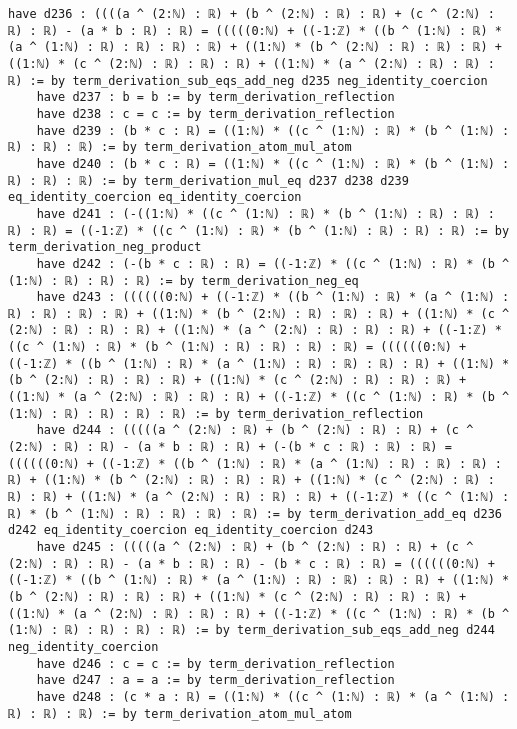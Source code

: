 \documentclass{article}
\begin{document}
\begin{tcolorbox}[colback=white!10, width=\linewidth]
\begin{lstlisting}[language=Lean4]
    have d236 : ((((a ^ (2:ℕ) : ℝ) + (b ^ (2:ℕ) : ℝ) : ℝ) + (c ^ (2:ℕ) : ℝ) : ℝ) - (a * b : ℝ) : ℝ) = (((((0:ℕ) + ((-1:ℤ) * ((b ^ (1:ℕ) : ℝ) * (a ^ (1:ℕ) : ℝ) : ℝ) : ℝ) : ℝ) + ((1:ℕ) * (b ^ (2:ℕ) : ℝ) : ℝ) : ℝ) + ((1:ℕ) * (c ^ (2:ℕ) : ℝ) : ℝ) : ℝ) + ((1:ℕ) * (a ^ (2:ℕ) : ℝ) : ℝ) : ℝ) := by term_derivation_sub_eqs_add_neg d235 neg_identity_coercion
    have d237 : b = b := by term_derivation_reflection
    have d238 : c = c := by term_derivation_reflection
    have d239 : (b * c : ℝ) = ((1:ℕ) * ((c ^ (1:ℕ) : ℝ) * (b ^ (1:ℕ) : ℝ) : ℝ) : ℝ) := by term_derivation_atom_mul_atom
    have d240 : (b * c : ℝ) = ((1:ℕ) * ((c ^ (1:ℕ) : ℝ) * (b ^ (1:ℕ) : ℝ) : ℝ) : ℝ) := by term_derivation_mul_eq d237 d238 d239 eq_identity_coercion eq_identity_coercion
    have d241 : (-((1:ℕ) * ((c ^ (1:ℕ) : ℝ) * (b ^ (1:ℕ) : ℝ) : ℝ) : ℝ) : ℝ) = ((-1:ℤ) * ((c ^ (1:ℕ) : ℝ) * (b ^ (1:ℕ) : ℝ) : ℝ) : ℝ) := by term_derivation_neg_product
    have d242 : (-(b * c : ℝ) : ℝ) = ((-1:ℤ) * ((c ^ (1:ℕ) : ℝ) * (b ^ (1:ℕ) : ℝ) : ℝ) : ℝ) := by term_derivation_neg_eq
    have d243 : ((((((0:ℕ) + ((-1:ℤ) * ((b ^ (1:ℕ) : ℝ) * (a ^ (1:ℕ) : ℝ) : ℝ) : ℝ) : ℝ) + ((1:ℕ) * (b ^ (2:ℕ) : ℝ) : ℝ) : ℝ) + ((1:ℕ) * (c ^ (2:ℕ) : ℝ) : ℝ) : ℝ) + ((1:ℕ) * (a ^ (2:ℕ) : ℝ) : ℝ) : ℝ) + ((-1:ℤ) * ((c ^ (1:ℕ) : ℝ) * (b ^ (1:ℕ) : ℝ) : ℝ) : ℝ) : ℝ) = ((((((0:ℕ) + ((-1:ℤ) * ((b ^ (1:ℕ) : ℝ) * (a ^ (1:ℕ) : ℝ) : ℝ) : ℝ) : ℝ) + ((1:ℕ) * (b ^ (2:ℕ) : ℝ) : ℝ) : ℝ) + ((1:ℕ) * (c ^ (2:ℕ) : ℝ) : ℝ) : ℝ) + ((1:ℕ) * (a ^ (2:ℕ) : ℝ) : ℝ) : ℝ) + ((-1:ℤ) * ((c ^ (1:ℕ) : ℝ) * (b ^ (1:ℕ) : ℝ) : ℝ) : ℝ) : ℝ) := by term_derivation_reflection
    have d244 : (((((a ^ (2:ℕ) : ℝ) + (b ^ (2:ℕ) : ℝ) : ℝ) + (c ^ (2:ℕ) : ℝ) : ℝ) - (a * b : ℝ) : ℝ) + (-(b * c : ℝ) : ℝ) : ℝ) = ((((((0:ℕ) + ((-1:ℤ) * ((b ^ (1:ℕ) : ℝ) * (a ^ (1:ℕ) : ℝ) : ℝ) : ℝ) : ℝ) + ((1:ℕ) * (b ^ (2:ℕ) : ℝ) : ℝ) : ℝ) + ((1:ℕ) * (c ^ (2:ℕ) : ℝ) : ℝ) : ℝ) + ((1:ℕ) * (a ^ (2:ℕ) : ℝ) : ℝ) : ℝ) + ((-1:ℤ) * ((c ^ (1:ℕ) : ℝ) * (b ^ (1:ℕ) : ℝ) : ℝ) : ℝ) : ℝ) := by term_derivation_add_eq d236 d242 eq_identity_coercion eq_identity_coercion d243
    have d245 : (((((a ^ (2:ℕ) : ℝ) + (b ^ (2:ℕ) : ℝ) : ℝ) + (c ^ (2:ℕ) : ℝ) : ℝ) - (a * b : ℝ) : ℝ) - (b * c : ℝ) : ℝ) = ((((((0:ℕ) + ((-1:ℤ) * ((b ^ (1:ℕ) : ℝ) * (a ^ (1:ℕ) : ℝ) : ℝ) : ℝ) : ℝ) + ((1:ℕ) * (b ^ (2:ℕ) : ℝ) : ℝ) : ℝ) + ((1:ℕ) * (c ^ (2:ℕ) : ℝ) : ℝ) : ℝ) + ((1:ℕ) * (a ^ (2:ℕ) : ℝ) : ℝ) : ℝ) + ((-1:ℤ) * ((c ^ (1:ℕ) : ℝ) * (b ^ (1:ℕ) : ℝ) : ℝ) : ℝ) : ℝ) := by term_derivation_sub_eqs_add_neg d244 neg_identity_coercion
    have d246 : c = c := by term_derivation_reflection
    have d247 : a = a := by term_derivation_reflection
    have d248 : (c * a : ℝ) = ((1:ℕ) * ((c ^ (1:ℕ) : ℝ) * (a ^ (1:ℕ) : ℝ) : ℝ) : ℝ) := by term_derivation_atom_mul_atom

\end{lstlisting}
\end{tcolorbox}
\end{document}
